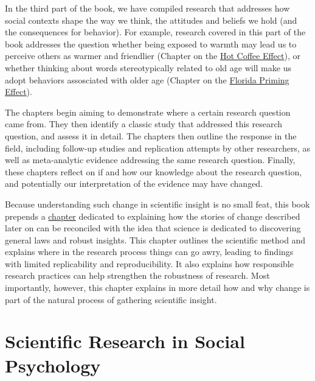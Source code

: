 \documentclass[
  letterpaper,
]{book}
\begin{document}
In the third part of the book, we have compiled research that addresses
how social contexts shape the way we think, the attitudes and beliefs we
hold (and the consequences for behavior). For example, research covered
in this part of the book addresses the question whether being exposed to
warmth may lead us to perceive others as warmer and friendlier (Chapter
on the \href{chapter20.qmd}{Hot Coffee Effect}), or whether thinking
about words stereotypically related to old age will make us adopt
behaviors assosciated with older age (Chapter on the
\href{chapter19.qmd}{Florida Priming Effect}).

The chapters begin aiming to demonstrate where a certain research
question came from. They then identify a classic study that addressed
this research question, and assess it in detail. The chapters then
outline the response in the field, including follow-up studies and
replication attempts by other researchers, as well as meta-analytic
evidence addressing the same research question. Finally, these chapters
reflect on if and how our knowledge about the research question, and
potentially our interpretation of the evidence may have changed.

Because understanding such change in scientific insight is no small
feat, this book prepends a \href{science.qmd}{chapter} dedicated to
explaining how the stories of change described later on can be
reconciled with the idea that science is dedicated to discovering
general laws and robust insights. This chapter outlines the scientific
method and explains where in the research process things can go awry,
leading to findings with limited replicability and reproducibility. It
also explains how responsible research practices can help strengthen the
robustness of research. Most importantly, however, this chapter explains
in more detail how and why change is part of the natural process of
gathering scientific insight.


\chapter*{\texorpdfstring{{Scientific Research in Social
Psychology}}{Scientific Research in Social Psychology}}\label{scientific-research-in-social-psychology}

\end{document}
